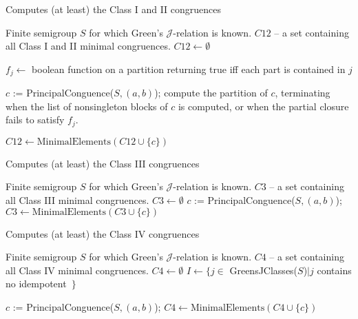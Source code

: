 \documentclass{acmconf}
\begin{document}
\begin{algorithm}
\caption{Computes (at least) the Class I and II congruences}
\label{A:class12}
\begin{algorithmic}[1]
\REQUIRE Finite semigroup $S$ for which Green's $\mathscr{J}$-relation 
is known.
\ENSURE $C12$ -- a set containing all Class I and II minimal congruences.
\STATE $C12 \leftarrow \emptyset$

	\STATE $f_j \leftarrow $ boolean function on a partition
	 returning true iff each part is contained in $j$
		
		\STATE $c$ := PrincipalConguence($S, (a,b)$);
		\STATE compute the partition of $c$, terminating when the list of 
			nonsingleton blocks of $c$ is computed, or when the partial closure
			fails to satisfy $f_j$.
			
			\STATE {}
			\STATE $C12 \leftarrow
			\mbox{MinimalElements}(C12 \cup \{c\})$
		\ENDIF
	\ENDFOR
\ENDFOR
\end{algorithmic}
\end{algorithm}


\begin{algorithm}
\caption{Computes (at least) the Class III congruences}
\label{A:class3}
\begin{algorithmic}[1]
\REQUIRE Finite semigroup $S$ for which Green's $\mathscr{J}$-relation 
is known.
\ENSURE $C3$ -- a set containing all Class III minimal congruences.
\STATE $C3 \leftarrow \emptyset$
				\STATE $c$ := PrincipalConguence($S, (a,b)$);
					\STATE $C3 \leftarrow
					\mbox{MinimalElements}(C3 \cup \{c\})$
				\ENDIF
			\ENDFOR
		\ENDFOR
	\ENDFOR
\ENDFOR
\end{algorithmic}
\end{algorithm}


\begin{algorithm}
\caption{Computes (at least) the Class IV congruences}
\label{A:class4}
\begin{algorithmic}[1]
\REQUIRE Finite semigroup $S$ for which Green's $\mathscr{J}$-relation 
is known.
\ENSURE $C4$ -- a set containing all Class IV minimal congruences.
\STATE $C4 \leftarrow \emptyset$
\STATE $I \leftarrow \{j \in $ GreensJClasses($S$)$ \mid 
j $ contains no idempotent~$\}$

			\STATE $c$ := PrincipalConguence($S, (a,b)$);
			\STATE  {}
				\STATE $C4 \leftarrow
				\mbox{MinimalElements}(C4 \cup \{c\})$
			\ENDIF
		\ENDFOR
	\ENDFOR
\ENDFOR
\end{algorithmic}
\end{algorithm}
\end{document}
